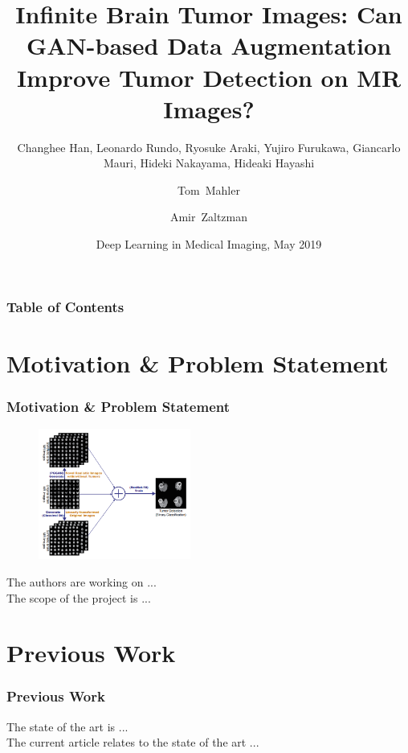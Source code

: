 \documentclass{beamer}
\title[Deep Learning in Medical Imaging Seminar]{Infinite Brain Tumor Images: Can GAN-based Data Augmentation Improve Tumor Detection on MR Images?}
\subtitle{\footnotesize Changhee Han, Leonardo Rundo, Ryosuke Araki, Yujiro Furukawa, Giancarlo Mauri, Hideki Nakayama, Hideaki Hayashi}
\author[Mahler, Zaltzman]{Tom~Mahler\inst{1} \and Amir~Zaltzman\inst{2}}
\institute[BGU, TAU] %
{
  \inst{1}%
  Faculty of Software and Information Systems Engineering\\
  Ben-Gurion University of the Negev
  \and
  \inst{2}%
  Faculty of Electrical Engineering\\
  Tel Aviv University
}
\date[May 2019] %
{Deep Learning in Medical Imaging, May 2019}
\begin{document}
\frame{\titlepage}


\begin{frame}
\frametitle{Table of Contents}
\tableofcontents
\end{frame}







\section{Motivation \& Problem Statement}
\begin{frame}
\frametitle{Motivation \& Problem Statement}
\begin{figure}
   \includegraphics[width=5cm]{img/PGGAN-based_DA}
\end{figure}

The authors are working on ...\\
The scope of the project is ...
\end{frame}


\section{Previous Work}
\begin{frame}
\frametitle{Previous Work}
The state of the art is ...\\
The current article relates to the state of the art ...
\end{frame}
\end{document}
